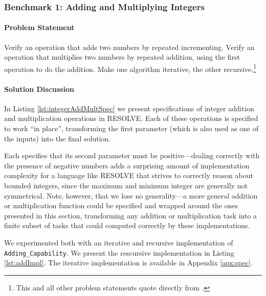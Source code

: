 		\subsubsection{Benchmark 1: Adding and Multiplying Integers}	%

\paragraph{Problem Statement}Verify an operation that adds two numbers by repeated incrementing. Verify an operation that multiplies two numbers by repeated addition, using the first operation to do the addition. Make one algorithm iterative, the other recursive.\footnote{This and all other problem statements quote directly from \cite{Benchmarks}.}

\paragraph{Solution Discussion}In Listing \ref{lst:integerAddMultSpec} we present specifications of integer addition and multiplication operations in RESOLVE.  Each of these operations is specified to work ``in place'', transforming the first parameter (which is also used as one of the inputs) into the final solution.



Each specifies that its second parameter must be positive---dealing correctly with the presence of negative numbers adds a surprising amount of implementation complexity for a language like RESOLVE that strives to correctly reason about bounded integers, since the maximum and minimum integer are generally not symmetrical.  Note, however, that we lose no generality---a more general addition or multiplication function could be specified and wrapped around the ones presented in this section, transforming any addition or multiplication task into a finite subset of tasks that could computed correctly by these implementations.

We experimented both with an iterative and recursive implementation of \texttt{Adding\_Capability}.  We present the rescursive implementation in Listing \ref{lst:addImpl}.  The iterative implementation is available in Appendix \ref{apx:spec}.

